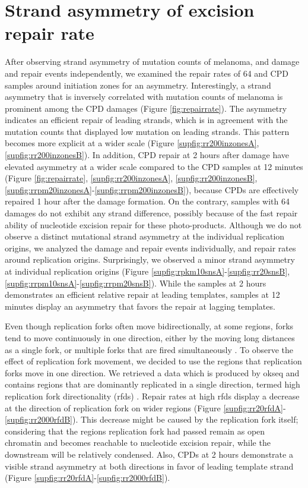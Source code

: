 \section{Strand asymmetry of excision repair rate}

After observing strand asymmetry of mutation counts of melanoma, and damage and repair events independently, we examined the repair rates of \gls{64} and \gls{CPD} samples around initiation zones for an asymmetry. Interestingly, a strand asymmetry that is inversely correlated with mutation counts of melanoma is prominent among the \gls{CPD} damages (Figure \ref{fig:repairrate}). The asymmetry indicates an efficient repair of leading strands, which is in agreement with the mutation counts that displayed low mutation on leading strands. This pattern becomes more explicit at a wider scale (Figure \ref{supfig:rr200inzonesA}, \ref{supfig:rr200inzonesB}). In addition, \gls{CPD} repair at 2 hours after damage have elevated asymmetry at a wider scale compared to the \gls{CPD} samples at 12 minutes (Figure \ref{fig:repairrate}, \ref{supfig:rr200inzonesA}, \ref{supfig:rr200inzonesB}, \ref{supfig:rrpm20inzonesA}-\ref{supfig:rrpm200inzonesB}), because \gls{CPD}s are effectively repaired 1 hour after the damage formation. On the contrary, samples with \gls{64} damages do not exhibit any strand difference, possibly because of the fast repair ability of nucleotide excision repair for these photo-products. Although we do not observe a distinct mutational strand asymmetry at the individual replication origins, we analyzed the damage and repair events individually, and repair rates around replication origins. Surprisingly, we observed a minor strand asymmetry at individual replication origins (Figure \ref{supfig:rpkm10snsA}-\ref{supfig:rr20snsB}, \ref{supfig:rrpm10snsA}-\ref{supfig:rrpm20snsB}). While the samples at 2 hours demonstrates an efficient relative repair at leading templates, samples at 12 minutes display an asymmetry that favors the repair at lagging templates. 

Even though replication forks often move bidirectionally, at some regions, forks tend to move continuously in one direction, either by the moving long distances as a single fork, or multiple forks that are fired simultaneously \citep{takebayashi2017anatomy}. To observe the effect of replication fork movement, we decided to use the regions that replication forks move in one direction. We retrieved a data which is produced by \gls{okseq} and contains regions that are dominantly replicated in a single direction, termed high replication fork directionality (\gls{rfd}s) \citep{petryk2016replication}. Repair rates at high \gls{rfd}s display a decrease at the direction of replication fork on wider regions (Figure \ref{supfig:rr20rfdA}-\ref{supfig:rr2000rfdB}). This decrease might be caused by the replication fork itself; considering that the regions replication fork had passed remain as open chromatin and becomes reachable to nucleotide excision repair, while the downstream will be relatively condensed. Also, \gls{CPD}s at 2 hours demonstrate a visible strand asymmetry at both directions in favor of leading template strand (Figure \ref{supfig:rr20rfdA}-\ref{supfig:rr2000rfdB}). 

